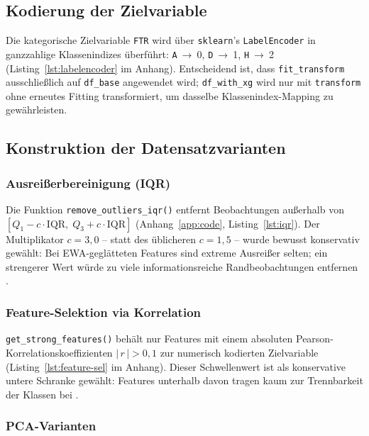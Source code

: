 \subsection{Kodierung der Zielvariable}

Die kategorische Zielvariable \texttt{FTR} wird über
\texttt{sklearn}'s \texttt{LabelEncoder} in ganzzahlige Klassenindizes
überführt: \texttt{A}~→~0, \texttt{D}~→~1, \texttt{H}~→~2
(Listing~\ref{lst:labelencoder} im Anhang). Entscheidend ist, dass
\texttt{fit\_transform} ausschließlich auf \texttt{df\_base} angewendet
wird; \texttt{df\_with\_xg} wird nur mit \texttt{transform} ohne erneutes
Fitting transformiert, um dasselbe Klassenindex-Mapping zu gewährleisten.

\subsection{Konstruktion der Datensatzvarianten}

\subsubsection{Ausreißerbereinigung (IQR)}

Die Funktion \texttt{remove\_outliers\_iqr()} entfernt Beobachtungen
außerhalb von $[Q_1 - c \cdot \text{IQR},\; Q_3 + c \cdot \text{IQR}]$
(Anhang~\ref{app:code}, Listing~\ref{lst:iqr}). Der Multiplikator
$c = 3{,}0$ -- statt des üblicheren $c = 1{,}5$ -- wurde bewusst
konservativ gewählt: Bei EWA-geglätteten Features sind extreme Ausreißer
selten; ein strengerer Wert würde zu viele informationsreiche
Randbeobachtungen entfernen \cite{JamesEtAl2021}.

\subsubsection{Feature-Selektion via Korrelation}

\texttt{get\_strong\_features()} behält nur Features mit einem absoluten
Pearson-Korrelationskoeffizienten $|\,r\,| > 0{,}1$ zur numerisch
kodierten Zielvariable (Listing~\ref{lst:feature-sel} im Anhang). Dieser
Schwellenwert ist als konservative untere Schranke gewählt: Features
unterhalb davon tragen kaum zur Trennbarkeit der Klassen bei
\cite{JamesEtAl2021}.

\subsubsection{PCA-Varianten}

